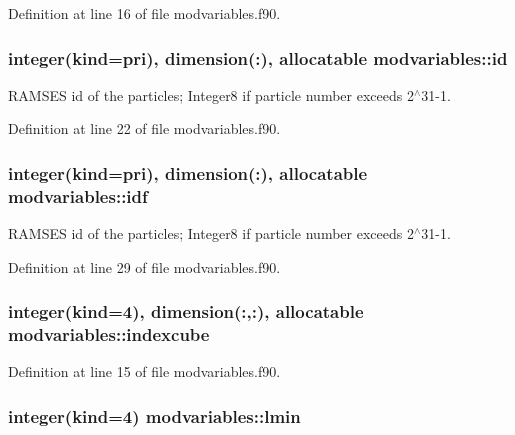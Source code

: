Definition at line 16 of file modvariables.\-f90.

\hypertarget{classmodvariables_ac2069a0665c46610db9e57a5d5eaf195}{
\subsubsection[{id}]{\setlength{\rightskip}{0pt plus 5cm}integer(kind=pri), dimension(\-:), allocatable modvariables\-::id}}\label{classmodvariables_ac2069a0665c46610db9e57a5d5eaf195}


R\-A\-M\-S\-E\-S id of the particles; Integer8 if particle number exceeds 2$^\wedge$31-\/1. 



Definition at line 22 of file modvariables.\-f90.

\hypertarget{classmodvariables_a74cd7fb485e34ae685664db5b2629aa9}{
\subsubsection[{idf}]{\setlength{\rightskip}{0pt plus 5cm}integer(kind=pri), dimension(\-:), allocatable modvariables\-::idf}}\label{classmodvariables_a74cd7fb485e34ae685664db5b2629aa9}


R\-A\-M\-S\-E\-S id of the particles; Integer8 if particle number exceeds 2$^\wedge$31-\/1. 



Definition at line 29 of file modvariables.\-f90.

\hypertarget{classmodvariables_a46e17f78883958892917ac536b4ab1b1}{
\subsubsection[{indexcube}]{\setlength{\rightskip}{0pt plus 5cm}integer(kind=4), dimension(\-:,\-:), allocatable modvariables\-::indexcube}}\label{classmodvariables_a46e17f78883958892917ac536b4ab1b1}


Definition at line 15 of file modvariables.\-f90.

\hypertarget{classmodvariables_ac0a0cf8631d5bf1592b35087a83ced9e}{
\subsubsection[{lmin}]{\setlength{\rightskip}{0pt plus 5cm}integer(kind=4) modvariables\-::lmin}}\label{classmodvariables_ac0a0cf8631d5bf1592b35087a83ced9e}


